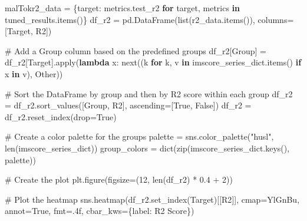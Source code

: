 \documentclass[
  letterpaper,
  DIV=11,
  numbers=noendperiod]{scrartcl}
\newenvironment{Shaded}{\begin{snugshade}}{\end{snugshade}}
\newcommand{\BuiltInTok}[1]{\textcolor[rgb]{0.00,0.23,0.31}{#1}}
\newcommand{\CommentTok}[1]{\textcolor[rgb]{0.37,0.37,0.37}{#1}}
\newcommand{\ControlFlowTok}[1]{\textcolor[rgb]{0.00,0.23,0.31}{\textbf{#1}}}
\newcommand{\DecValTok}[1]{\textcolor[rgb]{0.68,0.00,0.00}{#1}}
\newcommand{\FloatTok}[1]{\textcolor[rgb]{0.68,0.00,0.00}{#1}}
\newcommand{\KeywordTok}[1]{\textcolor[rgb]{0.00,0.23,0.31}{\textbf{#1}}}
\newcommand{\NormalTok}[1]{\textcolor[rgb]{0.00,0.23,0.31}{#1}}
\newcommand{\OperatorTok}[1]{\textcolor[rgb]{0.37,0.37,0.37}{#1}}
\newcommand{\StringTok}[1]{\textcolor[rgb]{0.13,0.47,0.30}{#1}}
\newcommand{\VariableTok}[1]{\textcolor[rgb]{0.07,0.07,0.07}{#1}}
\begin{document}
\begin{Shaded}
\begin{Highlighting}[]
malTok{r2\_data }\OperatorTok{=}\NormalTok{ \{target: metrics.test\_r2 }\ControlFlowTok{for}\NormalTok{ target, metrics }\KeywordTok{in}\NormalTok{ tuned\_results.items()\}}
\NormalTok{df\_r2 }\OperatorTok{=}\NormalTok{ pd.DataFrame(}\BuiltInTok{list}\NormalTok{(r2\_data.items()), columns}\OperatorTok{=}\NormalTok{[}\StringTok{\textquotesingle{}Target\textquotesingle{}}\NormalTok{, }\StringTok{\textquotesingle{}R2\textquotesingle{}}\NormalTok{])}

\CommentTok{\# Add a \textquotesingle{}Group\textquotesingle{} column based on the predefined groups}
\NormalTok{df\_r2[}\StringTok{\textquotesingle{}Group\textquotesingle{}}\NormalTok{] }\OperatorTok{=}\NormalTok{ df\_r2[}\StringTok{\textquotesingle{}Target\textquotesingle{}}\NormalTok{].}\BuiltInTok{apply}\NormalTok{(}\KeywordTok{lambda}\NormalTok{ x: }\BuiltInTok{next}\NormalTok{((k }\ControlFlowTok{for}\NormalTok{ k, v }\KeywordTok{in}\NormalTok{ imscore\_series\_dict.items() }\ControlFlowTok{if}\NormalTok{ x }\KeywordTok{in}\NormalTok{ v), }\StringTok{\textquotesingle{}Other\textquotesingle{}}\NormalTok{))}

\CommentTok{\# Sort the DataFrame by group and then by R2 score within each group}
\NormalTok{df\_r2 }\OperatorTok{=}\NormalTok{ df\_r2.sort\_values([}\StringTok{\textquotesingle{}Group\textquotesingle{}}\NormalTok{, }\StringTok{\textquotesingle{}R2\textquotesingle{}}\NormalTok{], ascending}\OperatorTok{=}\NormalTok{[}\VariableTok{True}\NormalTok{, }\VariableTok{False}\NormalTok{])}
\NormalTok{df\_r2 }\OperatorTok{=}\NormalTok{ df\_r2.reset\_index(drop}\OperatorTok{=}\VariableTok{True}\NormalTok{)}

\CommentTok{\# Create a color palette for the groups}
\NormalTok{palette }\OperatorTok{=}\NormalTok{ sns.color\_palette(}\StringTok{"husl"}\NormalTok{, }\BuiltInTok{len}\NormalTok{(imscore\_series\_dict))}
\NormalTok{group\_colors }\OperatorTok{=} \BuiltInTok{dict}\NormalTok{(}\BuiltInTok{zip}\NormalTok{(imscore\_series\_dict.keys(), palette))}

\CommentTok{\# Create the plot}
\NormalTok{plt.figure(figsize}\OperatorTok{=}\NormalTok{(}\DecValTok{12}\NormalTok{, }\BuiltInTok{len}\NormalTok{(df\_r2) }\OperatorTok{*} \FloatTok{0.4} \OperatorTok{+} \DecValTok{2}\NormalTok{))}

\CommentTok{\# Plot the heatmap}
\NormalTok{sns.heatmap(df\_r2.set\_index(}\StringTok{\textquotesingle{}Target\textquotesingle{}}\NormalTok{)[[}\StringTok{\textquotesingle{}R2\textquotesingle{}}\NormalTok{]], }
\NormalTok{            cmap}\OperatorTok{=}\StringTok{\textquotesingle{}YlGnBu\textquotesingle{}}\NormalTok{, }
\NormalTok{            annot}\OperatorTok{=}\VariableTok{True}\NormalTok{, }
\NormalTok{            fmt}\OperatorTok{=}\StringTok{\textquotesingle{}.4f\textquotesingle{}}\NormalTok{, }
\NormalTok{            cbar\_kws}\OperatorTok{=}\NormalTok{\{}\StringTok{\textquotesingle{}label\textquotesingle{}}\NormalTok{: }\StringTok{\textquotesingle{}R2 Score\textquotesingle{}}\NormalTok{\})}


\end{Highlighting}
\end{Shaded}
\end{document}
